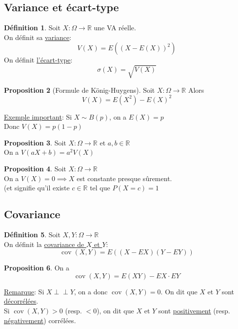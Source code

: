 \documentclass[10pt,a4paper]{article}
\theoremstyle{definition}
\newtheorem{proposition}{Proposition}[section]
\newtheorem{definition}[proposition]{Définition}
\DeclareMathOperator{\cov}{cov}
\newcommand{\indep}{\mathrel{\perp \!\!\! \perp}}
\begin{document}
\subsection{Variance et écart-type}
\begin{definition}
Soit $X: \Omega \to \mathbb{R}$ une VA réelle. \\
On définit sa \uline{variance}:
\[ V(X) = E((X - E(X))^2) \]
On définit \uline{l'écart-type}:
\[ \sigma(X) = \sqrt{V(X)} \]
\end{definition}
\begin{proposition}[Formule de König-Huygens]
Soit $X: \Omega \to \mathbb{R}$
Alors
\[ V(X) = E(X^2) - E(X)^2 \]
\end{proposition}
\noindent \uline{Exemple important}: Si $X \sim B(p)$, on a $E(X) = p$ \\
Donc $V(X) = p(1 - p)$
\begin{proposition}
Soit $X: \Omega \to \mathbb{R}$ et $a, b \in \mathbb{R}$ \\
On a $V(aX + b) = a^2 V(X)$
\end{proposition}
\begin{proposition}
Soit $X: \Omega \to \mathbb{R}$ \\
On a $V(X) = 0 \implies X$ est constante presque sûrement. \\
(et signifie qu'il existe $c \in \mathbb{R}$ tel que $P(X = c) = 1$
\end{proposition}

\subsection{Covariance}
\begin{definition}
Soit $X, Y: \Omega \to \mathbb{R}$ \\
On définit la \uline{covariance de $X$ et $Y$}: 
\[ \cov(X, Y) = E\left((X - EX)(Y - EY)\right) \]
\end{definition}
\begin{proposition}
On a
\[ \cov(X, Y) = E(XY) - EX \cdot EY \]
\end{proposition}
\noindent \uline{Remarque}: Si $X \indep Y$, on a donc $\cov(X, Y) = 0$. On dit que $X$ et $Y$ sont \uline{décorrélées}. \\
Si $\cov(X, Y) > 0$ (resp. $< 0$), on dit que $X$ et $Y$ sont \uline{positivement} (resp. \uline{négativement}) corrélées. \medskip
\end{document}
